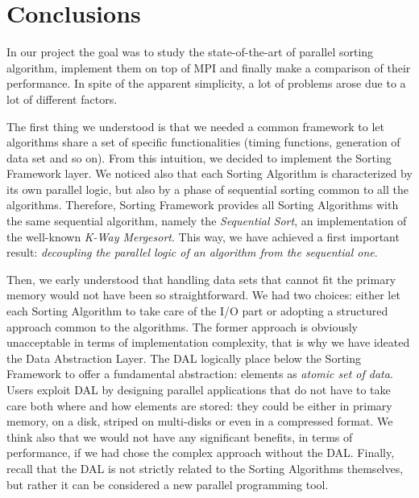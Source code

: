 \label{conclusion}
\section{Conclusions}
In our project the goal was to study the state-of-the-art of parallel sorting algorithm, implement them on top of MPI and finally make a comparison of their performance. In spite of the apparent simplicity, a lot of problems arose due to a lot of different factors.  

The first thing we understood is that we needed a common framework to let algorithms share a set of specific functionalities (timing functions, generation of data set and so on). From this intuition, we decided to implement the Sorting Framework layer. We noticed also that each Sorting Algorithm is characterized by its own parallel logic, but also by a phase of sequential sorting common to all the algorithms. Therefore, Sorting Framework provides all Sorting Algorithms with the same sequential algorithm, namely the \textit{Sequential Sort}, an implementation of the well-known \textit{K-Way Mergesort}. This way, we have achieved a first important result: \textit{decoupling the parallel logic of an algorithm from the sequential one}. 

Then, we early understood that handling data sets that cannot fit the primary memory would not have been so straightforward. We had two choices: either let each Sorting Algorithm to take care of the I/O part or adopting a structured approach common to the algorithms. The former approach is obviously unacceptable in terms of implementation complexity, that is why we have ideated the Data Abstraction Layer. The DAL logically place below the Sorting Framework to offer a fundamental abstraction: elements as \textit{atomic set of data}. Users exploit DAL by designing parallel applications that do not have to take care both where and how elements are stored: they could be either in primary memory, on a disk, striped on multi-disks or even in a compressed format. We think also that we would not have any significant benefits, in terms of performance, if we had chose the complex approach without the DAL. Finally, recall that the DAL is not strictly related to the Sorting Algorithms themselves, but rather it can be considered a new parallel programming tool.

